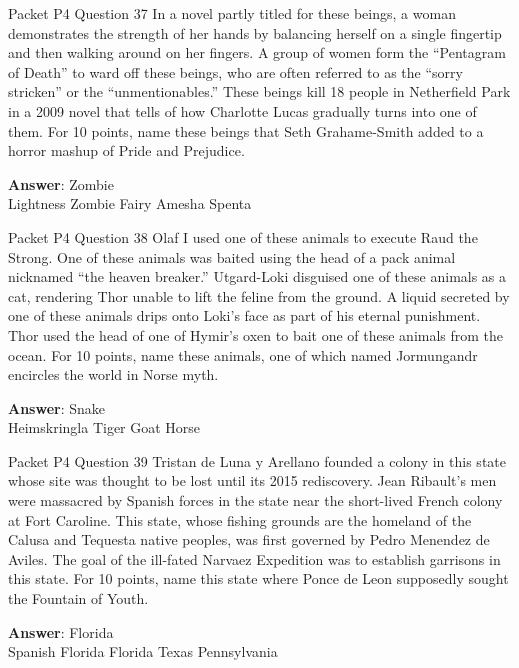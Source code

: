 \begin{frame}{Packet P4 Question 37}
In a novel partly titled   for these beings, a woman demonstrates the strength of her hands by balancing herself on a single fingertip and then walking around on her fingers. A group of women form the “Pentagram of Death” to ward off these beings, who are often referred to as the “sorry stricken” or the “unmentionables.” These beings kill 18 people in Netherfield Park in a 2009 novel that tells of how Charlotte Lucas gradually turns into one of them. For 10 points, name these beings that Seth Grahame-Smith added to a horror mashup of Pride and Prejudice.      

\textbf{Answer}: Zombie\\
 Lightness
 Zombie
 Fairy
 Amesha Spenta
\end{frame}

\begin{frame}{Packet P4 Question 38}
Olaf I used one of these   animals to execute Raud the Strong. One of these animals was baited using the   head of a pack animal nicknamed “the heaven breaker.” Utgard-Loki disguised one of these animals as a cat, rendering Thor unable to lift the feline from the ground. A liquid secreted by one of these animals drips onto Loki’s face as part of his eternal punishment. Thor used the head of one of Hymir’s oxen to bait one of these animals from the ocean. For 10 points, name these animals, one of which named Jormungandr encircles the world in Norse myth.    

\textbf{Answer}: Snake\\
 Heimskringla
 Tiger
 Goat
 Horse
\end{frame}

\begin{frame}{Packet P4 Question 39}
Tristan de Luna y Arellano founded a colony in this state whose site was thought to be lost until its 2015 rediscovery. Jean Ribault’s men were massacred by Spanish forces in the state near the short-lived French colony at Fort Caroline. This state, whose fishing grounds are the homeland of the Calusa and Tequesta native   peoples, was first governed by Pedro Menendez de Aviles. The goal of the ill-fated Narvaez Expedition was to establish garrisons in this state. For 10 points, name this state where Ponce de Leon supposedly sought the Fountain of Youth.      

\textbf{Answer}: Florida\\
 Spanish Florida
 Florida
 Texas
 Pennsylvania
\end{frame}

